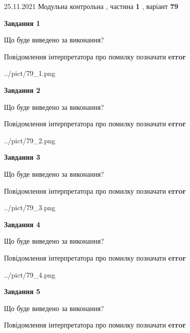 \documentclass[10pt, ukrainian]{article}
\begin{document}
{25.11.2021 Модульна контрольна , частина \textbf { 1 }, варіант  \No \textbf { 79 }\par}
{
\begin {large}

{\begin {center}\textbf{Завдання 1}\end {center}}\par
Що буде виведено за виконання? \par
Повідомлення інтерпретатора про помилку позначати \textbf{error}

\begin{center}
	{../pict/79_1.png}
\end{center}
\newpage

{\begin {center}\textbf{Завдання 2}\end {center}}\par
Що буде виведено за виконання? \par
Повідомлення інтерпретатора про помилку позначати \textbf{error}

\begin{center}
	{../pict/79_2.png}
\end{center}
\newpage

{\begin {center}\textbf{Завдання 3}\end {center}}\par
Що буде виведено за виконання? \par
Повідомлення інтерпретатора про помилку позначати \textbf{error}

\begin{center}
	{../pict/79_3.png}
\end{center}
\newpage

{\begin {center}\textbf{Завдання 4}\end {center}}\par
Що буде виведено за виконання? \par
Повідомлення інтерпретатора про помилку позначати \textbf{error}

\begin{center}
	{../pict/79_4.png}
\end{center}
\newpage

{\begin {center}\textbf{Завдання 5}\end {center}}\par
Що буде виведено за виконання? \par
Повідомлення інтерпретатора про помилку позначати \textbf{error}


\end{large}}
\end{document}
